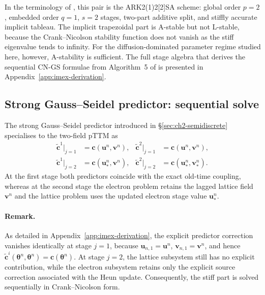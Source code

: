 In the terminology of \cite{Kennedy_2003}, this pair is the ARK2(1)2[2]SA scheme: global order \(p=2\), embedded order \(q=1\), \(s=2\) stages, two-part additive split, and stiffly accurate implicit tableau. The implicit trapezoidal part is A-stable but not L-stable, because the Crank--Nicolson stability function does not vanish as the stiff eigenvalue tends to infinity. For the diffusion-dominated parameter regime studied here, however, A-stability is sufficient. The full stage algebra that derives the sequential CN-GS formulae from Algorithm~5 of \cite{Huang_2019} is presented in Appendix~\ref{app:imex-derivation}.

\subsection{Strong Gauss--Seidel predictor: sequential solve}
\label{sec:ch2-strong-gs}

The strong Gauss--Seidel predictor introduced in \S\ref{sec:ch2-semidiscrete} specialises to the two-field pTTM as
\begin{subequations}\label{eq:ch2-gs-predictors}
    \begin{align}
        \tilde{\mathbf{c}}^{1}\big|_{j=1}
         & =
        \mathbf{c}(\mathbf{u}^{n},\mathbf{v}^{n}),
         &
        \tilde{\mathbf{c}}^{2}\big|_{j=1}
         & =
        \mathbf{c}(\mathbf{u}^{n},\mathbf{v}^{n}),
        \label{eq:ch2-gs-predictors-a} \\
        \tilde{\mathbf{c}}^{1}\big|_{j=2}
         & =
        \mathbf{c}(\mathbf{u}^{n}_{*},\mathbf{v}^{n}),
         &
        \tilde{\mathbf{c}}^{2}\big|_{j=2}
         & =
        \mathbf{c}(\mathbf{u}^{n}_{*},\mathbf{v}^{n}_{*}).
        \label{eq:ch2-gs-predictors-b}
    \end{align}
\end{subequations}
At the first stage both predictors coincide with the exact old-time coupling, whereas at the second stage the electron problem retains the lagged lattice field \(\mathbf{v}^{n}\) and the lattice problem uses the updated electron stage value \(\mathbf{u}^{n}_{*}\).

\paragraph{Remark.}
As detailed in Appendix~\ref{app:imex-derivation}, the explicit predictor correction vanishes identically at stage \(j=1\), because \(\mathbf{u}_{n,1}=\mathbf{u}^{n}\), \(\mathbf{v}_{n,1}=\mathbf{v}^{n}\), and hence \(\tilde{\mathbf{c}}^{i}(\boldsymbol{\theta}^{n},\boldsymbol{\theta}^{n})=\mathbf{c}(\boldsymbol{\theta}^{n})\). At stage \(j=2\), the lattice subsystem still has no explicit contribution, while the electron subsystem retains only the explicit source correction associated with the Heun update. Consequently, the stiff part is solved sequentially in Crank--Nicolson form.

